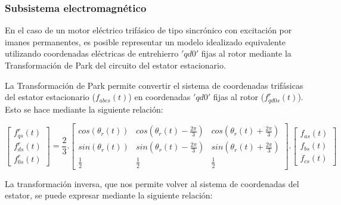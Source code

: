 \documentclass{article}
\begin{document}
    \subsubsection{Subsistema electromagnético}
        
    En el caso de un motor eléctrico trifásico de tipo sincrónico con excitación por imanes permanentes, 
    es posible representar un modelo idealizado equivalente utilizando coordenadas eléctricas de 
    entrehierro $'qd0'$ fijas al rotor mediante la Transformación de Park del circuito del estator 
    estacionario.

    La Transformación de Park permite convertir el sistema de coordenadas trifásicas del estator 
    estacionario ($f_{abcs}(t)$) en coordenadas $'qd0'$ fijas al rotor ($f^r_{qd0s}(t)$). Esto se hace 
    mediante la siguiente relación:

    \begin{equation}\label{eq:transformacion_de_park}
        \begin{bmatrix}
            f_{qs}^r(t)\\
            f_{ds}^r(t)\\
            f_{0s}^r(t)
        \end{bmatrix}
        =\frac{2}{3}.
        \begin{bmatrix}
            cos(\theta_r(t)) & cos(\theta_r(t) - \frac{2\pi}{3}) & cos(\theta_r(t) + \frac{2\pi}{3})\\
            sin(\theta_r(t)) & sin(\theta_r(t) - \frac{2\pi}{3}) & sin(\theta_r(t) + \frac{2\pi}{3})\\
            \frac{1}{2} & \frac{1}{2} & \frac{1}{2}
        \end{bmatrix}.
        \begin{bmatrix}
            f_{as}(t)\\
            f_{bs}(t)\\
            f_{cs}(t)
        \end{bmatrix}
    \end{equation}

    La transformación inversa, que nos permite volver al sistema de coordenadas del estator, se puede 
    expresar mediante la siguiente relación:
    
\end{document}
